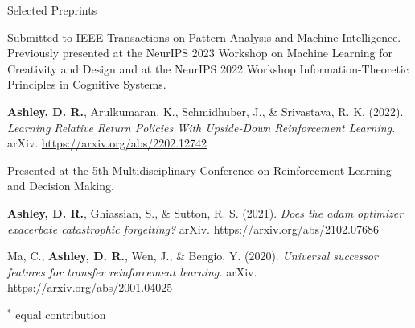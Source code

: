 \documentclass{cv}
\begin{document}
\begin{rSection}{Selected Preprints}
\begin{rPublications}
        \vspace{-0.1em} Submitted to {IEEE} Transactions on Pattern Analysis and Machine Intelligence. Previously presented at the NeurIPS 2023 Workshop on Machine Learning for Creativity and Design and at the NeurIPS 2022 Workshop Information-Theoretic Principles in Cognitive Systems.
    \item
        \textbf{Ashley, D. R.}, Arulkumaran, K., Schmidhuber, J., \& Srivastava, R. K.
        (2022).
        \textit{Learning Relative Return Policies With Upside-Down Reinforcement Learning.}
        arXiv.
        \url{https://arxiv.org/abs/2202.12742}

        \vspace{-0.1em} Presented at the 5th Multidisciplinary Conference on Reinforcement Learning and Decision Making.
    \item
        \textbf{Ashley, D. R.}, Ghiassian, S., \& Sutton, R. S.
        (2021).
        \textit{Does the adam optimizer exacerbate catastrophic forgetting?}
        arXiv.
        \url{https://arxiv.org/abs/2102.07686}
    \item
        Ma, C., \textbf{Ashley, D. R.}, Wen, J., \& Bengio, Y.
        (2020).
        \textit{Universal successor features for transfer reinforcement learning.}
        arXiv.
        \url{https://arxiv.org/abs/2001.04025}
\end{rPublications}

\vspace{-0.3em} \hfill $^*$ \footnotesize{equal contribution} \vspace{-0.7em}

\end{rSection}

\clearpage

\end{document}
